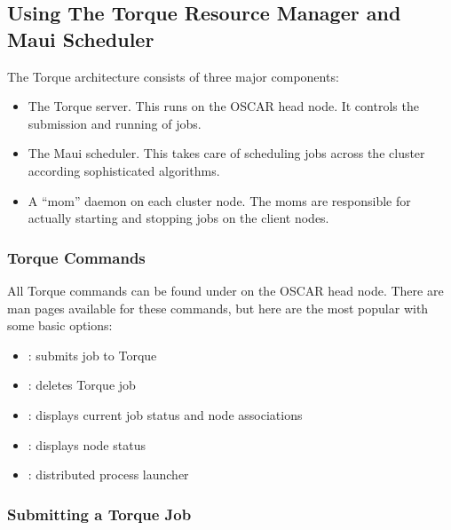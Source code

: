 %
%
%

\subsection{Using The Torque Resource Manager and Maui Scheduler}
\label{app:torque-overview}

The Torque architecture consists of three major components:

\begin{itemize}
\item The Torque server.  This runs on the OSCAR head node.  It controls
  the submission and running of jobs.

\item The Maui scheduler.  This takes care of scheduling jobs across
  the cluster according sophisticated algorithms.

\item A ``mom'' daemon on each cluster node.  The moms are responsible
  for actually starting and stopping jobs on the client nodes.
\end{itemize}

\subsubsection{Torque Commands}

All Torque commands can be found under  on
the OSCAR head node.  There are man pages available for these
commands, but here are the most popular with some basic options:

\begin{itemize}
\item {}: submits job to Torque

\item {}: deletes Torque job

\item {}: displays current job status and node
  associations

\item {}: displays node status

\item {}: distributed process launcher
\end{itemize}

\subsubsection{Submitting a Torque Job}

